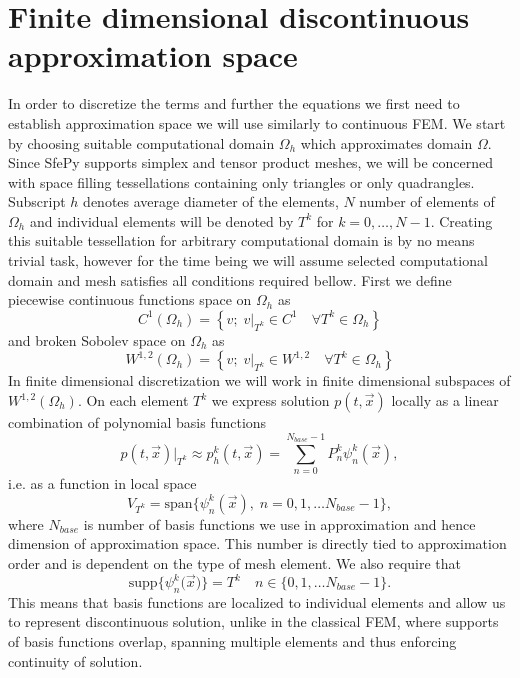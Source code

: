 \section{Finite dimensional discontinuous approximation space}
In order to discretize the terms and further the equations we first need to 
establish approximation space we will use similarly to continuous FEM. We start 
by choosing suitable computational domain $\Omega_h$ which approximates domain 
$\Omega$. Since SfePy supports simplex and tensor product meshes, we will be 
concerned with space filling tessellations containing only triangles or 
only quadrangles. Subscript $h$ denotes average diameter of the elements, $N$ 
number of elements of $\Omega_h$ and individual elements will be denoted by 
$T^k$ for $k=0, \ldots, N - 1$. Creating this suitable tessellation for 
arbitrary computational domain is by no means trivial task, however for the 
time being we will assume selected computational domain and mesh satisfies all 
conditions required bellow. First we define piecewise continuous functions 
space on $\Omega_h$ as 
\begin{equation}
	C^1(\Omega_h) =  \left\{v;\; v\vert_{T^k} \in C^1 \quad \forall T^k \in 
	\Omega_h \right\}
\end{equation}
and broken Sobolev space on $\Omega_h$ as
\begin{equation}\label{eq:sobh}
	W^{1, 2}(\Omega_h) = \left\{v;\; v\vert_{T^k} \in W^{1, 2}\quad \forall T^k 
	\in \Omega_h \right\}
\end{equation}
In finite dimensional discretization we will work in finite dimensional 
subspaces of $W^{1, 2}(\Omega_h)$. On each element $T^k$ we express 
solution $p(t, \vec{x})$ locally as a linear combination of polynomial basis functions
\begin{equation}
\label{eq:el_lin_comb}
	p(t, \vec{x})|_{T^k} \approx p_h^k(t, \vec{x}) = \sum\limits_{n=0}^{N_{base} - 1} 
	P_n^k\psi^k_n(\vec{x}),
\end{equation}
i.e. as a function in local space
\begin{equation}
	V_{T^k} = \text{span}\big\{ \psi_n^k(\vec{x}), \; n = 0,1, \dots  
	N_{base}-1\big\},
\end{equation}
where $N_{base}$ is number of basis functions we use in approximation and hence 
dimension of approximation space. This number is directly tied to approximation 
order and is dependent on the type of mesh element. We also require that
\begin{equation}
	\text{supp}\big\{\psi_n^k(\vec{x}\big)\} = T^k \quad n \in \{0,1, 
	\dots  N_{base}-1\}.
\end{equation}
This means that basis functions are localized to individual elements and allow 
us to represent discontinuous solution, unlike in the classical FEM, where 
supports of basis functions overlap, spanning multiple elements and  thus 
enforcing continuity of solution.

